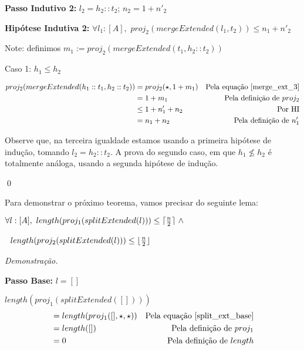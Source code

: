 \documentclass[12pt, oneside, a4paper,english,brazil]{abntex2}
\DeclarePairedDelimiter\floor{\lfloor}{\rfloor}
\DeclarePairedDelimiter\ceil{\lceil}{\rceil}
\begin{document}
\textbf{Passo Indutivo 2: } $l_{2} = h_{2} :: t_{2}$; $n_{2} = 1 + n'_{2}$

\textbf{Hip\'otese Indutiva 2: } $\forall l_{1} : [A], \,\, proj_{2}(mergeExtended(l_{1}, t_{2})) \le n_{1} + n'_{2}$

Note: definimos $m_{1} := proj_{2}(mergeExtended(t_{1}, h_{2} :: t_{2}))$

Caso 1: $h_{1} \le h_{2}$

\begin{align*}
  proj_{2}(mergeExtended(h_{1} :: t_{1}, h_{2} :: t_{2})) &= proj_{2}(\star, 1 + m_{1}) &\text{Pela equa\c{c}\~ao \ref{merge_ext_3}} \\
                                                          &= 1 + m_{1} &\text{Pela defini\c{c}\~ao de $proj_{2}$} \\
                                                          &\le 1 + n'_{1} + n_{2} &\text{Por HI} \\
  &= n_{1} + n_{2} &\text{Pela defini\c{c}\~ao de $n'_{1}$}
\end{align*}

Observe que, na terceira igualdade estamos usando a primeira hip\'otese de
indu\c{c}\~ao, tomando $l_{2} = h_{2} :: t_{2}$. A prova do segundo caso, em que $h_{1} \not\le h_{2}$ \'e totalmente an\'aloga, usando a segunda hip\'otese de indu\c{c}\~ao.

\qed

Para demonstrar o pr\'oximo teorema, vamos precisar do seguinte lema:

\begin{lema}\label{split_half}
  $\forall l : [A], \,\, length(proj_{1}(splitExtended(l))) \le \ceil{\frac{n}{2}}\,\, \wedge$

  \qquad \qquad \qquad \qquad \,\, $length(proj_{2}(splitExtended(l))) \le \floor{\frac{n}{2}}$
\end{lema}

\noindent \textit{Demonstra\c{c}\~ao.}

\textbf{Passo Base: } $l = []$

$length(proj_{1}(splitExtended([])))$
\begin{align*}
  &= length(proj_{1}([], \star, \star)) &\text{Pela equa\c{c}\~ao \ref{split_ext_base}}\\
  &= length([]) &\text{Pela defini\c{c}\~ao de $proj_{1}$}\\
  &= 0 &\text{Pela defini\c{c}\~ao de $length$}
\end{align*}
\end{document}
